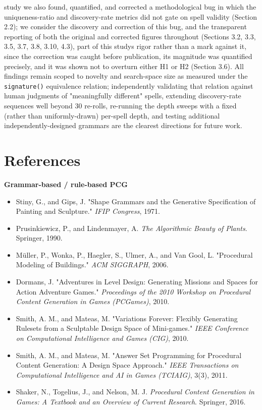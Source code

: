 \documentclass[
  10pt,
  twocolumn]{article}
\providecommand{\tightlist}{%
  \setlength{\itemsep}{0pt}\setlength{\parskip}{0pt}}
\begin{document}
study we also found, quantified, and corrected a methodological bug in
which the uniqueness-ratio and discovery-rate metrics did not gate on
spell validity (Section 2.2); we consider the discovery and correction
of this bug, and the transparent reporting of both the original and
corrected figures throughout (Sections 3.2, 3.3, 3.5, 3.7, 3.8, 3.10,
4.3), part of this study\textquotesingle s rigor rather than a mark
against it, since the correction was caught before publication, its
magnitude was quantified precisely, and it was shown not to overturn
either H1 or H2 (Section 3.6). All findings remain scoped to novelty and
search-space size as measured under the \texttt{signature()} equivalence
relation; independently validating that relation against human judgments
of "meaningfully different" spells, extending discovery-rate sequences
well beyond 30 re-rolls, re-running the depth sweeps with a fixed
(rather than uniformly-drawn) per-spell depth, and testing additional
independently-designed grammars are the clearest directions for future
work.

\section{References}\label{references}

\textbf{Grammar-based / rule-based PCG}

\begin{itemize}
\tightlist
\item
  Stiny, G., and Gips, J. "Shape Grammars and the Generative
  Specification of Painting and Sculpture." \emph{IFIP Congress}, 1971.
\item
  Prusinkiewicz, P., and Lindenmayer, A. \emph{The Algorithmic Beauty of
  Plants}. Springer, 1990.
\item
  Müller, P., Wonka, P., Haegler, S., Ulmer, A., and Van Gool, L.
  "Procedural Modeling of Buildings." \emph{ACM SIGGRAPH}, 2006.
\item
  Dormans, J. "Adventures in Level Design: Generating Missions and
  Spaces for Action Adventure Games." \emph{Proceedings of the 2010
  Workshop on Procedural Content Generation in Games (PCGames)}, 2010.
\item
  Smith, A. M., and Mateas, M. "Variations Forever: Flexibly Generating
  Rulesets from a Sculptable Design Space of Mini-games." \emph{IEEE
  Conference on Computational Intelligence and Games (CIG)}, 2010.
\item
  Smith, A. M., and Mateas, M. "Answer Set Programming for Procedural
  Content Generation: A Design Space Approach." \emph{IEEE Transactions
  on Computational Intelligence and AI in Games (TCIAIG)}, 3(3), 2011.
\item
  Shaker, N., Togelius, J., and Nelson, M. J. \emph{Procedural Content
  Generation in Games: A Textbook and an Overview of Current Research}.
  Springer, 2016.
\end{itemize}
\end{document}
